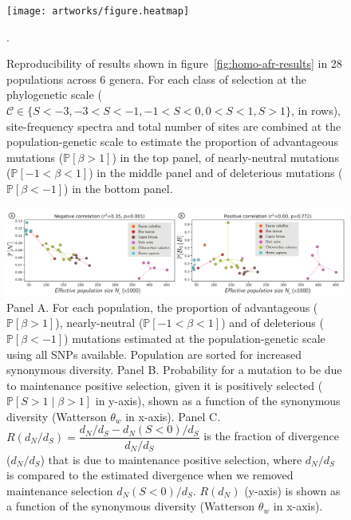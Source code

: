 \documentclass{article}
\newcommand{\proba}{\mathbb{P}}
\newcommand{\dn}{d_N}
\newcommand{\ds}{d_S}
\newcommand{\dnds}{\dn / \ds}
\newcommand{\Sphy}{S}
\newcommand{\Sphyclass}{\mathcal{C}}
\newcommand{\divStrongDel}{\Sphy < -3}
\newcommand{\divDel}{-3 < \Sphy < -1}
\newcommand{\divWeakDel}{-1 < \Sphy < 0}
\newcommand{\divWeakAdv}{0 < \Sphy < 1}
\newcommand{\divAdv}{ \Sphy > 1}
\newcommand{\given}{\mid}
\newcommand{\Spop}{\beta}
\newcommand{\polyDel}{\Spop < -1}
\newcommand{\polyNeutral}{-1 < \Spop < 1}
\newcommand{\polyAdv}{ \Spop > 1}
\newcommand{\PpolyDel}{\proba \left[ \polyDel \right]}
\newcommand{\PpolyNeutral}{\proba \left[ \polyNeutral \right]}
\newcommand{\PpolyAdv}{\proba \left[ \polyAdv \right]}
\begin{document}
    \begin{figure}[!ht]
        \centering
        \texttt{[image: artworks/figure.heatmap]}
        \caption{
            Reproducibility of results shown in figure~\ref{fig:homo-afr-results} in 28 populations across 6 genera.
            For each class of selection at the phylogenetic scale ($\Sphyclass \in \{ \divStrongDel, \divDel,  \divWeakDel,  \divWeakAdv, \divAdv \}$, in rows), site-frequency spectra and total number of sites are combined at the population-genetic scale to estimate the proportion of advantageous mutations ($\PpolyAdv$) in the top panel, of nearly-neutral mutations ($\PpolyNeutral$) in the middle panel and of deleterious mutations ($\PpolyDel$) in the bottom panel.
        }.
        \label{fig:heatmap}
    \end{figure}

    \begin{figure}[!ht]
        \centering
        \includegraphics[width=\textwidth, page=1] {artworks/figure.diversity}
        \caption{
            Panel A. For each population, the proportion of advantageous ($\PpolyAdv$), nearly-neutral ($\PpolyNeutral$) and of deleterious ($\PpolyDel$) mutations estimated at the population-genetic scale using all SNPs available.
            Population are sorted for increased synonymous diversity.
            Panel B. Probability for a mutation to be due to maintenance positive selection, given it is positively selected ($\mathbb{P} [ \Sphy > 1  \given  \Spop > 1]$ in y-axis), shown as a function of the synonymous diversity (Watterson $\theta_w$ in x-axis).
            Panel C. $R(\dnds)=\dfrac{\dnds - \dn(\Sphy < 0) / \ds}{\dnds}$ is the fraction of divergence ($\dnds$) that is due to maintenance positive selection, where $\dnds$ is compared to the estimated divergence when we removed maintenance selection $\dn(\Sphy < 0)/\ds$.
            $R(\dn)$ (y-axis) is shown as a function of the synonymous diversity (Watterson $\theta_w$ in x-axis).
        }
        \label{fig:diversity}
    \end{figure}
\end{document}

